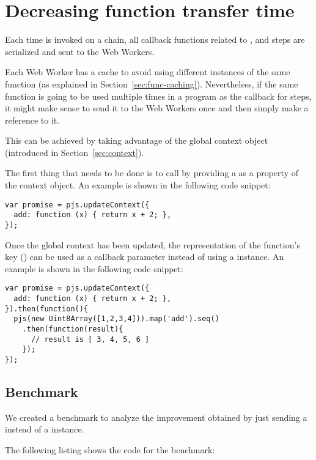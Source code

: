 \section{Decreasing function transfer time}\label{sec:function-transfer-time}

Each time  is invoked on a chain, all callback functions related to ,  and  steps are serialized and sent to the Web Workers.

Each Web Worker has a cache to avoid using different instances of the same function (as explained in Section~\ref{sec:func-caching}). Nevertheless, if the same function is going to be used multiple times in a program as the callback for steps, it might make sense to send it to the Web Workers once and then simply make a reference to it.

This can be achieved by taking advantage of the global context object (introduced in Section~\ref{sec:context}).

The first thing that needs to be done is to call  by providing a \tfunction{} as a property of the context object. An example is shown in the following code snippet:
\begin{lstlisting}[caption=Sending function in global context]
var promise = pjs.updateContext({
  add: function (x) { return x + 2; },
});
\end{lstlisting}

Once the global context has been updated, the \tstring{} representation of the function's key () can be used as a callback parameter instead of using a \tfunction{} instance. An example is shown in the following code snippet:
\begin{lstlisting}[caption=Passing a function name from the global context instead of a \tfunction{} as a callback]
var promise = pjs.updateContext({
  add: function (x) { return x + 2; },
}).then(function(){
  pjs(new Uint8Array([1,2,3,4])).map('add').seq()
    .then(function(result){
      // result is [ 3, 4, 5, 6 ]
    });
});
\end{lstlisting}

\subsection{Benchmark}
We created a benchmark to analyze the improvement obtained by just sending a \tstring{} instead of a \tfunction{} instance.

The following listing shows the code for the benchmark:

